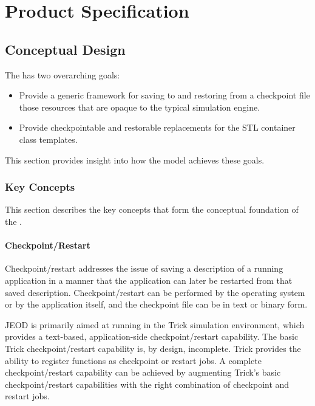 \chapter{Product Specification}\label{ch:spec}

\section{Conceptual Design}
\label{sec:conceptual_design}

The \ModelDesc has two overarching goals:
\begin{itemize}
\item Provide a generic framework for saving to and restoring from a checkpoint
file those resources that are opaque to the typical simulation engine.
\item Provide checkpointable and restorable replacements for
the STL container class templates.
\end{itemize}

This section provides insight into how the model achieves these goals.

\subsection{Key Concepts}\label{sec:key_concepts}
This section describes the key concepts that form the conceptual foundation of
the \ModelDesc.

\subsubsection{Checkpoint/Restart}\label{sec:key_checkpoint}
Checkpoint/restart addresses the issue of saving a description of a running
application in a manner that the application can later be restarted from
that saved description. Checkpoint/restart can be performed by the
operating system or by the application itself, and the checkpoint file can
be in text or binary form.

JEOD is primarily aimed at running in the Trick simulation environment, which
provides a text-based, application-side checkpoint/restart capability.
The basic Trick checkpoint/restart capability is, by design, incomplete.
Trick provides the ability to register functions as checkpoint or restart
jobs. A complete checkpoint/restart capability can be achieved by
augmenting Trick's basic checkpoint/restart capabilities with the right
combination of checkpoint and restart jobs.

